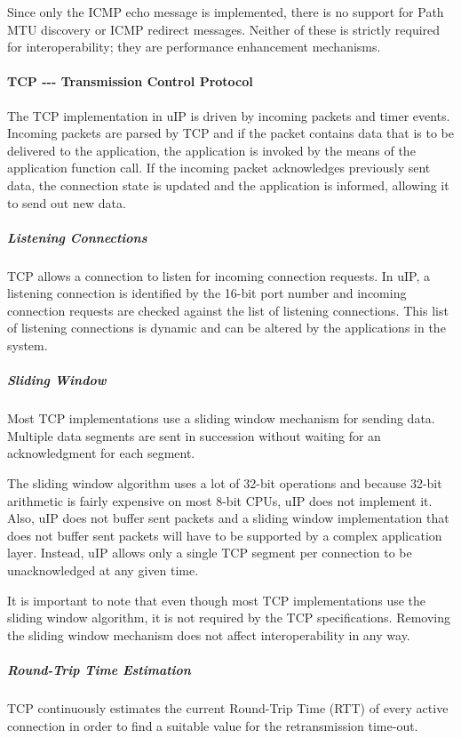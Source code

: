 \-Since only the \-I\-C\-M\-P echo message is implemented, there is no support for \-Path \-M\-T\-U discovery or \-I\-C\-M\-P redirect messages. \-Neither of these is strictly required for interoperability; they are performance enhancement mechanisms.\hypertarget{a00060_tcp}{}\paragraph{\-T\-C\-P -\/-\/-\/ Transmission Control Protocol}\label{a00060_tcp}
\-The \-T\-C\-P implementation in u\-I\-P is driven by incoming packets and timer events. \-Incoming packets are parsed by \-T\-C\-P and if the packet contains data that is to be delivered to the application, the application is invoked by the means of the application function call. \-If the incoming packet acknowledges previously sent data, the connection state is updated and the application is informed, allowing it to send out new data.\hypertarget{a00060_listeb}{}\subparagraph{\-Listening Connections}\label{a00060_listeb}
\-T\-C\-P allows a connection to listen for incoming connection requests. \-In u\-I\-P, a listening connection is identified by the 16-\/bit port number and incoming connection requests are checked against the list of listening connections. \-This list of listening connections is dynamic and can be altered by the applications in the system.\hypertarget{a00060_slidingwindow}{}\subparagraph{\-Sliding Window}\label{a00060_slidingwindow}
\-Most \-T\-C\-P implementations use a sliding window mechanism for sending data. \-Multiple data segments are sent in succession without waiting for an acknowledgment for each segment.

\-The sliding window algorithm uses a lot of 32-\/bit operations and because 32-\/bit arithmetic is fairly expensive on most 8-\/bit \-C\-P\-Us, u\-I\-P does not implement it. \-Also, u\-I\-P does not buffer sent packets and a sliding window implementation that does not buffer sent packets will have to be supported by a complex application layer. \-Instead, u\-I\-P allows only a single \-T\-C\-P segment per connection to be unacknowledged at any given time.

\-It is important to note that even though most \-T\-C\-P implementations use the sliding window algorithm, it is not required by the \-T\-C\-P specifications. \-Removing the sliding window mechanism does not affect interoperability in any way.\hypertarget{a00060_rttest}{}\subparagraph{\-Round-\/\-Trip Time Estimation}\label{a00060_rttest}
\-T\-C\-P continuously estimates the current \-Round-\/\-Trip \-Time (\-R\-T\-T) of every active connection in order to find a suitable value for the retransmission time-\/out.

